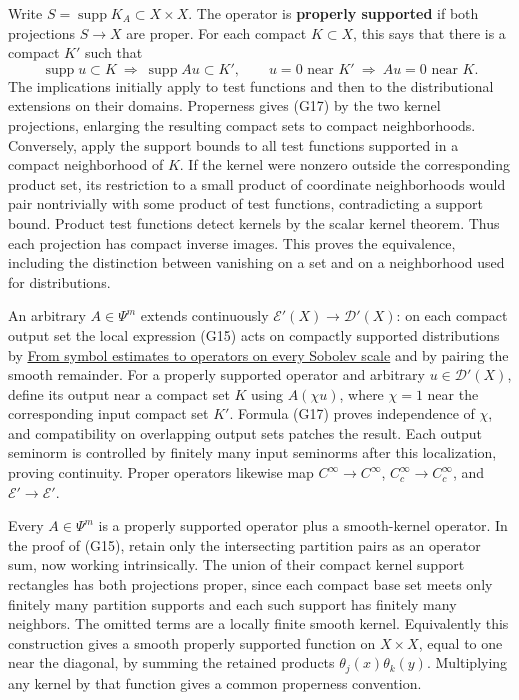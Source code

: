 \documentclass[
  11pt,
]{article}
\begin{document}
Write \(S=\operatorname{supp}K_A\subset X\times X\). The operator is
\textbf{properly supported} if both projections \(S\to X\) are proper.
For each compact \(K\subset X\), this says that there is a compact
\(K'\) such that \[
\operatorname{supp}u\subset K\ \Longrightarrow\ \operatorname{supp}Au\subset K',
\qquad
u=0\text{ near }K'\ \Longrightarrow\ Au=0\text{ near }K.
\tag{G17}
\] The implications initially apply to test functions and then to the
distributional extensions on their domains. Properness gives (G17) by
the two kernel projections, enlarging the resulting compact sets to
compact neighborhoods. Conversely, apply the support bounds to all test
functions supported in a compact neighborhood of \(K\). If the kernel
were nonzero outside the corresponding product set, its restriction to a
small product of coordinate neighborhoods would pair nontrivially with
some product of test functions, contradicting a support bound. Product
test functions detect kernels by the scalar kernel theorem. Thus each
projection has compact inverse images. This proves the equivalence,
including the distinction between vanishing on a set and on a
neighborhood used for distributions.

An arbitrary \(A\in\Psi^m\) extends continuously
\(\mathcal E'(X)\to\mathcal D'(X)\): on each compact output set the
local expression (G15) acts on compactly supported distributions by
\href{euclidean-symbol-calculus.pdf}{From symbol estimates to operators
on every Sobolev scale} and by pairing the smooth remainder. For a
properly supported operator and arbitrary \(u\in\mathcal D'(X)\), define
its output near a compact set \(K\) using \(A(\chi u)\), where
\(\chi=1\) near the corresponding input compact set \(K'\). Formula
(G17) proves independence of \(\chi\), and compatibility on overlapping
output sets patches the result. Each output seminorm is controlled by
finitely many input seminorms after this localization, proving
continuity. Proper operators likewise map \(C^\infty\to C^\infty\),
\(C_c^\infty\to C_c^\infty\), and \(\mathcal E'\to\mathcal E'\).

Every \(A\in\Psi^m\) is a properly supported operator plus a
smooth-kernel operator. In the proof of (G15), retain only the
intersecting partition pairs as an operator sum, now working
intrinsically. The union of their compact kernel support rectangles has
both projections proper, since each compact base set meets only finitely
many partition supports and each such support has finitely many
neighbors. The omitted terms are a locally finite smooth kernel.
Equivalently this construction gives a smooth properly supported
function on \(X\times X\), equal to one near the diagonal, by summing
the retained products \(\theta_j(x)\theta_k(y)\). Multiplying any kernel
by that function gives a common properness convention.
\end{document}
